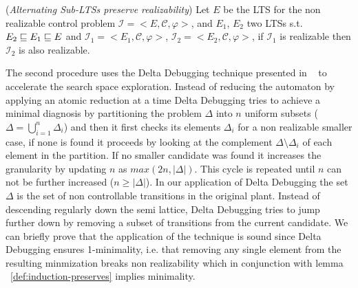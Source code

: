 \begin{lemma}\label{def:induction-preserves}(\emph{Alternating Sub-LTSs preserve realizability})
Let $E$ be the LTS for the non realizable control problem
$\mathcal{I}=<E,\mathcal{C}, \varphi>$, and $E_1$, $E_2$ two LTSs s.t. 
$E_2 \sqsubseteq E_1 \sqsubseteq E$ and
$\mathcal{I}_1=<E_1, \mathcal{C}, \varphi>$, $\mathcal{I}_2=<E_2, \mathcal{C}, \varphi>$, if $\mathcal{I}_1$ is realizable then $\mathcal{I}_2$ is also realizable.
\end{lemma}


The second procedure uses the Delta Debugging technique presented in ~\cite{DBLP:journals/tse/ZellerH02} to accelerate the search space exploration. Instead of reducing the automaton by applying an atomic reduction at a time Delta Debugging tries to achieve a minimal diagnosis by partitioning the problem $\Delta$ into $n$ uniform subsets ($\Delta = \bigcup_{i=1}^n \Delta_i $) and then it first checks its elements $\Delta_i$ for a non realizable smaller case, if none is found it proceeds by looking at the complement $\Delta \setminus \Delta_i$ of each element in the partition. If no smaller candidate was found it increases the granularity by updating $n$ as $max(2n,|\Delta|)$. This cycle is repeated until $n$ can not be further increased ($n \geq |\Delta|$). 
In our application of Delta Debugging the set $\Delta$ is the set of non controllable transitions in the original plant. Instead of descending regularly down the semi lattice, Delta Debugging tries to jump further down by removing a subset of transitions from the current candidate. We can briefly prove that the application of the technique is sound since Delta Debugging ensures 1-minimality, i.e. that removing any single element from the resulting minmization breaks non realizability which in conjunction with lemma ~\ref{def:induction-preserves} implies minimality.
